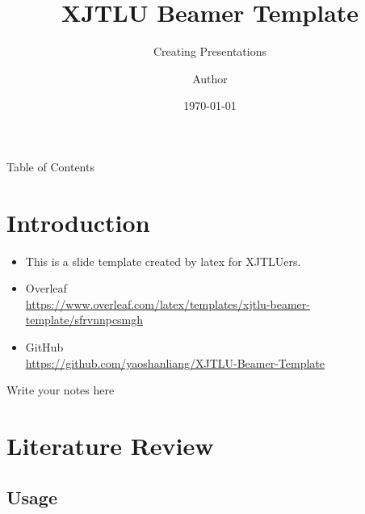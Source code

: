 \documentclass{libs/XJTLU_format}
\title[XJTLU Beamer Template]{\huge\textbf{XJTLU Beamer Template}}
\subtitle{Creating Presentations}
\author{Author}
\institute[XJTLU]{
    \normalsize{\email{author@xjtlu.edu.cn}}
    \newline
    \department{School of Advanced Technology}
    \newline
    \university{Xi'an Jiaotong-Liverpool University}
}
\date{\today}
\begin{document}


\begin{frame}{}
    \maketitle
\end{frame}

\begin{frame}{Table of Contents}
    \begin{multicols}{2}
        \tableofcontents
    \end{multicols}
\end{frame}

\section{Introduction}

\begin{frame}
    \begin{itemize}[<+-| alert@+>] %
    	\item This is a slide template created by latex for XJTLUers.
        \item Overleaf  \\ \url{https://www.overleaf.com/latex/templates/xjtlu-beamer-template/sfrvnnpcsmgh}
        \item GitHub \\ \url{https://github.com/yaoshanliang/XJTLU-Beamer-Template}
    \end{itemize}
    
    \begin{note}
        {Write your notes here}
    \end{note}
\end{frame}

\section{Literature Review}

\subsection{Usage}
\end{document}
